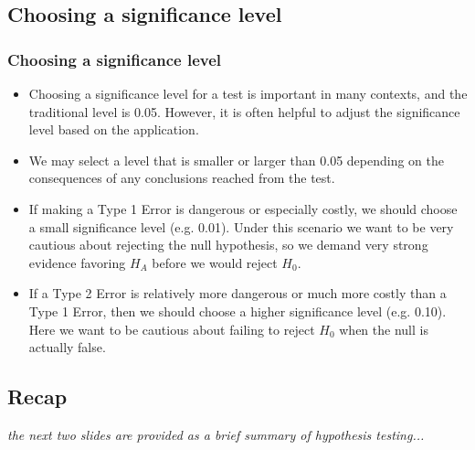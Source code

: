
\subsection{Choosing a significance level}


\begin{frame}
\frametitle{Choosing a significance level}

\begin{itemize}

\item Choosing a significance level for a test is important in many contexts, and the traditional level is 0.05. However, it is often helpful to adjust the significance level based on the application. 

\item We may select a level that is smaller or larger than 0.05 depending on the consequences of any conclusions reached from the test.

\item If making a Type 1 Error is dangerous or especially costly, we should choose a small significance level (e.g. 0.01). Under this scenario we want to be very cautious about rejecting the null hypothesis, so we demand very strong evidence favoring $H_A$ before we would reject $H_0$.

\item If a Type 2 Error is relatively more dangerous or much more costly than a Type 1 Error, then we should choose a higher significance level (e.g. 0.10). Here we want to be cautious about failing to reject $H_0$ when the null is actually false.

\end{itemize}

\end{frame}


\subsection{Recap}


\begin{frame}

\vfill

\textit{the next two slides are provided as a brief summary of hypothesis testing...}

\vfill

\end{frame}

